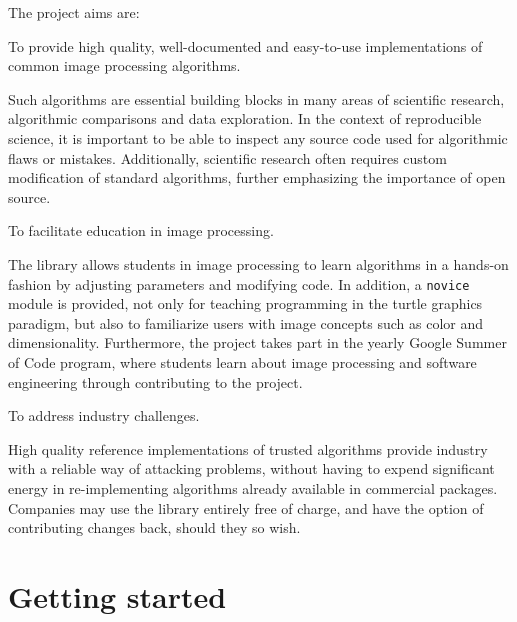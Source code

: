 \documentclass[fleqn,12pt]{wlpeerj}
\begin{document}
The project aims are:
\begin{list}{.}
{
\setlength{\rightmargin}{\leftmargin}
}

\item 

To provide high quality, well-documented and easy-to-use
implementations of common image processing algorithms.

Such algorithms are essential building blocks in many areas of scientific
research, algorithmic comparisons and data exploration. In the
context of reproducible science, it is important to be able to inspect any
source code used for algorithmic flaws or mistakes. Additionally, scientific
research often requires custom modification of standard algorithms, further
emphasizing the importance of open source.
\item 

To facilitate education in image processing.

The library allows students in image processing to learn algorithms in a
hands-on fashion by adjusting parameters and modifying code. In addition, a
\texttt{novice} module is provided, not only for teaching programming in the
\textquotedbl{}turtle graphics\textquotedbl{} paradigm, but also to familiarize users with image
concepts such as color and dimensionality. Furthermore, the project
takes part in the yearly Google Summer of Code \citep{gsoc} program, where
students learn about image processing and software engineering through
contributing to the project.
\item 

To address industry challenges.

High quality reference implementations of trusted algorithms provide
industry with a reliable way of attacking problems, without having to expend
significant energy in re-implementing algorithms already available in
commercial packages.  Companies may use the library entirely free of charge,
and have the option of contributing changes back, should they so wish.\end{list}


\section*{Getting started}
  \label{getting-started}
\end{document}
